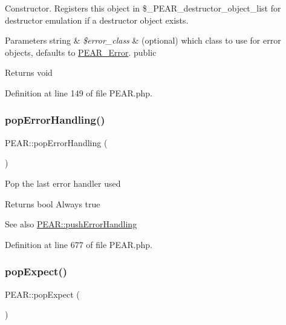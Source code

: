 Constructor. Registers this object in \$\+\_\+\+P\+E\+A\+R\+\_\+destructor\+\_\+object\+\_\+list for destructor emulation if a destructor object exists.


\begin{DoxyParams}[1]{Parameters}
string & {\em \$error\+\_\+class} & (optional) which class to use for error objects, defaults to \hyperlink{classPEAR__Error}{P\+E\+A\+R\+\_\+\+Error}.  public \\
\hline
\end{DoxyParams}
\begin{DoxyReturn}{Returns}
void 
\end{DoxyReturn}


Definition at line 149 of file P\+E\+A\+R.\+php.

\hypertarget{classPEAR_adc1bc0e4afb5652ad5c42bbd82b7a353}{}\label{classPEAR_adc1bc0e4afb5652ad5c42bbd82b7a353} 
\subsubsection{\texorpdfstring{pop\+Error\+Handling()}{popErrorHandling()}}
{\footnotesize\ttfamily P\+E\+A\+R\+::pop\+Error\+Handling (\begin{DoxyParamCaption}{ }\end{DoxyParamCaption})}

Pop the last error handler used

\begin{DoxyReturn}{Returns}
bool Always true
\end{DoxyReturn}
\begin{DoxySeeAlso}{See also}
\hyperlink{classPEAR_a44c791bbf9e490da1b053dcd075fd285}{P\+E\+A\+R\+::push\+Error\+Handling} 
\end{DoxySeeAlso}


Definition at line 677 of file P\+E\+A\+R.\+php.

\hypertarget{classPEAR_a3ea2df43e39214a29f77f8773a5afcc4}{}\label{classPEAR_a3ea2df43e39214a29f77f8773a5afcc4} 
\subsubsection{\texorpdfstring{pop\+Expect()}{popExpect()}}
{\footnotesize\ttfamily P\+E\+A\+R\+::pop\+Expect (\begin{DoxyParamCaption}{ }\end{DoxyParamCaption})}

